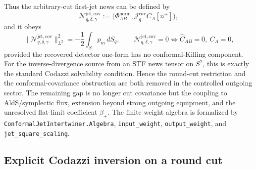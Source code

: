 \documentclass[11pt,a4paper]{article}
\newcommand{\cN}{\mathcal{N}}
\begin{document}
Thus the arbitrary-cut first-jet news can be defined by
\begin{equation}\label{eq:covariant-first-jet}
  \cN^{\mathrm{jet},\mathrm{cov}}_{q,\delta,\gamma}
  :=
  \big(
    \Phi^{\mathrm{norm}}_{AB},
    \mathcal J_q^{\mathrm{cov}}C_A[n^+]
  \big) ,
\end{equation}
and it obeys
\[
  \|\cN^{\mathrm{jet},\mathrm{cov}}_{q,\delta,\gamma}\|_{L^2}^2
  =
  -\frac12\int_S p_m\,dS_q ,
  \qquad
  \cN^{\mathrm{jet},\mathrm{cov}}_{q,\delta,\gamma}=0
  \iff
  \hat C_{AB}=0,\ C_A=0 ,
\]
provided the recovered detector one-form has no conformal-Killing component.  For the inverse-divergence source from an STF news tensor on \(S^2\), this is exactly the standard Codazzi solvability condition.  Hence the round-cut restriction and the conformal-covariance obstruction are both removed in the controlled outgoing sector.  The remaining gap is no longer cut covariance but the coupling to AldS/symplectic flux, extension beyond strong outgoing equipment, and the unresolved flat-limit coefficient \(\beta_+\).  The finite weight algebra is formalized by \texttt{ConformalJetIntertwiner.Algebra}, \texttt{input\_weight}, \texttt{output\_weight}, and \texttt{jet\_square\_scaling}.

\subsection{Explicit Codazzi inversion on a round cut}
\end{document}
